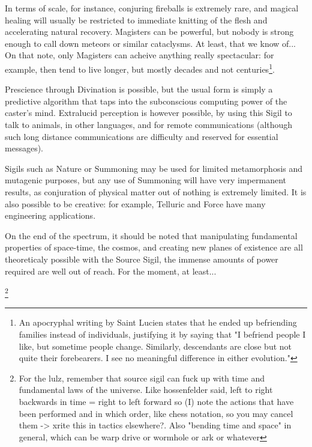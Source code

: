 In terms of scale, for instance, conjuring fireballs is extremely rare, and magical healing will usually be restricted to immediate knitting of the flesh and accelerating natural recovery. Magisters can be powerful, but nobody is strong enough to call down meteors or similar cataclysms. At least, that we know of... On that note, only Magisters can acheive anything really spectacular: for example, then tend to live longer, but mostly decades and not centuries\footnote{An apocryphal writing by Saint Lucien states that he ended up befriending families instead of individuals, justifying it by saying that "I befriend people I like, but sometime people change. Similarly, descendants are close but not quite their forebearers. I see no meaningful difference in either evolution."}.

Prescience through Divination is possible, but the usual form is simply a predictive algorithm that taps into the subconscious computing power of the caster's mind. Extralucid perception is however possible, by using this Sigil to talk to animals, in other languages, and for remote communications (although such long distance communications are difficulty and reserved for essential messages).

Sigils such as Nature or Summoning may be used for limited metamorphosis and mutagenic purposes, but any use of Summoning will have very impermanent results, as conjuration of physical matter out of nothing is extremely limited. It is also possible to be creative: for example, Telluric and Force have many engineering applications.

On the end of the spectrum, it should be noted that manipulating fundamental properties of space-time, the cosmos, and creating new planes of existence are all theoreticaly possible with the Source Sigil, the immense amounts of power required are well out of reach. For the moment, at least...











 \footnote{For the lulz, remember that source sigil can fuck up with time and fundamental laws of the universe. Like hossenfelder said, left to right backwards in time = right to left forward so (I) note the actions that have been performed and in which order, like chess notation, so you may cancel them -> xrite this in tactics elsewhere?. Also "bending time and space" in general, which can be warp drive or wormhole or ark or whatever}



